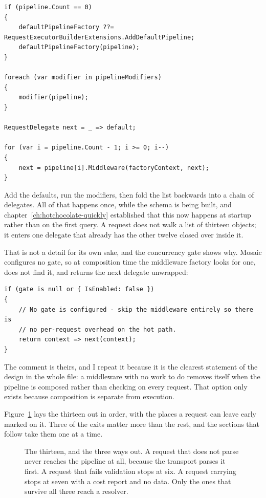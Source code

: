 \begin{verbatim}
if (pipeline.Count == 0)
{
    defaultPipelineFactory ??= RequestExecutorBuilderExtensions.AddDefaultPipeline;
    defaultPipelineFactory(pipeline);
}

foreach (var modifier in pipelineModifiers)
{
    modifier(pipeline);
}

RequestDelegate next = _ => default;

for (var i = pipeline.Count - 1; i >= 0; i--)
{
    next = pipeline[i].Middleware(factoryContext, next);
}
\end{verbatim}

Add the defaults, run the modifiers, then fold the list backwards into a chain
of delegates. All of that happens once, while the schema is being built, and
chapter~\ref{ch:hotchocolate-quickly} established that this now happens at
startup rather than on the first query. A request does not walk a list of
thirteen objects; it enters one delegate that already has the other twelve
closed over inside it.

%
That is not a detail for its own sake, and the concurrency gate shows why.
Mosaic configures no gate, so at composition time the middleware factory looks
for one, does not find it, and returns the next delegate unwrapped:

\begin{verbatim}
if (gate is null or { IsEnabled: false })
{
    // No gate is configured - skip the middleware entirely so there is
    // no per-request overhead on the hot path.
    return context => next(context);
}
\end{verbatim}

The comment is theirs, and I repeat it because it is the clearest statement of
the design in the whole file: a middleware with no work to do removes itself
when the pipeline is composed rather than checking on every request. That option
only exists because composition is separate from execution.

Figure~\ref{fig:ch03-pipeline} lays the thirteen out in order, with the places a
request can leave early marked on it. Three of the exits matter more than the
rest, and the sections that follow take them one at a time.

\begin{figure}[htbp]
  \centering
  
  \caption{The thirteen, and the three ways out. A request that does not parse
  never reaches the pipeline at all, because the transport parses it first. A
  request that fails validation stops at six. A request carrying
   stops at seven with a cost report and no data.
  Only the ones that survive all three reach a resolver.}
  \label{fig:ch03-pipeline}
\end{figure}

